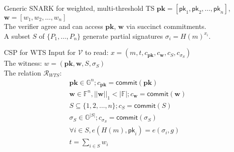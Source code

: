 \documentclass[10pt]{beamer}
\begin{document}
\begin{frame}{Generic SNARK for weighted, multi-threshold TS}
$\mathbf{pk} = [\mathsf{pk}_1, \mathsf{pk}_2,\dots, \mathsf{pk}_n]$, $\mathbf{w} = [w_1, w_2, \dots, w_n]$ \\
The verifier agree and can access $\mathbf{pk}$, $\mathbf{w}$ via succinct commitments. \\ \pause
\vspace{0.5em}
A subset $S$ of $\{P_1, \dots, P_n\}$ generate partial signatures $\sigma_i = H(m)^{x_i}$. \\ \pause

\begin{block}{CSP for WTS}
Input for $\mathcal{V}$ to read: $x = (m, t, c_{\mathbf{pk}}, c_{\mathbf{w}}, c_{S}, c_{\sigma_{S}})$ \\
The witness: $w = (\mathbf{pk}, \mathbf{w}, S, \sigma_S)$ \\
The relation $\mathcal{R}_{WTS}$: 
\begin{equation*}
    \begin{matrix}
        \mathbf{pk}\in \mathbb{G}^n; c_{\mathbf{pk}} = \mathsf{commit}(\mathbf{pk})\\
        \mathbf{w}\in \mathbb{F}^n, ||\mathbf{w}||_1<|\mathbb{F}|;  c_{\mathbf{w}} = \mathsf{commit}(\mathbf{w})\\
        S\subseteq \{1,2,\dots, n\}; c_{S} = \mathsf{commit}(S)\\
        \sigma_{S} \in \mathbb{G}^{|S|} ;c_{\sigma_{S}} = \mathsf{commit}(\sigma_S) \\
        \forall i\in S, e(H(m), \mathsf{pk}_i) = e(\sigma_i, g) \\
        t = \sum_{i\in S} w_i  \\
    \end{matrix}
\end{equation*}
\end{block}

\end{frame}
\end{document}
